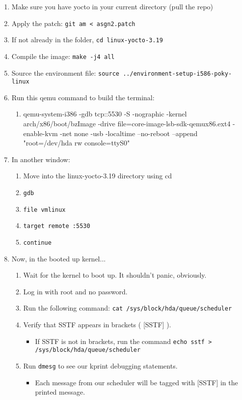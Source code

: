 \documentclass[letterpaper,10pt,titlepage]{article}
\begin{document}
\begin{enumerate}
	\item Make sure you have yocto in your current directory (pull the repo)
    \item Apply the patch: \verb|git am < asgn2.patch|
    \item If not already in the folder, \verb|cd linux-yocto-3.19|
    \item Compile the image: \verb|make -j4 all|
    \item Source the environment file: \verb|source ../environment-setup-i586-poky-linux|
    \item Run this qemu command to build the terminal:
    \begin{enumerate}
    	\item qemu-system-i386 -gdb tcp::5530 -S -nographic -kernel arch/x86/boot/bzImage -drive file=core-image-lsb-sdk-qemux86.ext4 -enable-kvm -net none -usb -localtime --no-reboot --append "root=/dev/hda rw console=ttyS0"
    \end{enumerate}
    \item In another window:
    \begin{enumerate}
    	\item Move into the linux-yocto-3.19 directory using cd
        \item \verb|gdb|
        \item \verb|file vmlinux|
        \item \verb|target remote :5530|
        \item \verb|continue|
     \end{enumerate}
     \item Now, in the booted up kernel...
     \begin{enumerate}
     	\item Wait for the kernel to boot up. It shouldn't panic, obviously.
        \item Log in with root and no password.
        \item Run the following command: \verb|cat /sys/block/hda/queue/scheduler|
        \item Verify that SSTF appears in brackets ( [SSTF] ).
        	\begin{itemize}
            	\item If SSTF is not in brackets, run the command \verb|echo sstf > /sys/block/hda/queue/scheduler|
            \end{itemize}
        \item Run \verb|dmesg| to see our kprint debugging statements.
        	\begin{itemize}
            	\item Each message from our scheduler will be tagged with [SSTF] in the printed message.
            \end{itemize}
     \end{enumerate}
\end{enumerate}
\end{document}
